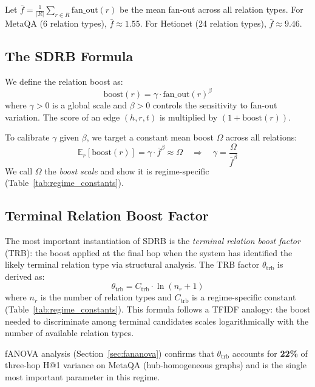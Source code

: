 \documentclass[11pt,a4paper]{article}
\begin{document}
Let $\bar{f} = \frac{1}{|R|}\sum_{r \in R} \text{fan\_out}(r)$ be the
mean fan-out across all relation types.
For MetaQA (6 relation types), $\bar{f} \approx 1.55$.
For Hetionet (24 relation types), $\bar{f} \approx 9.46$.

\subsection{The SDRB Formula}

We define the relation boost as:
\begin{equation}
  \text{boost}(r) = \gamma \cdot \text{fan\_out}(r)^{\beta}
  \label{eq:sdrb}
\end{equation}
where $\gamma > 0$ is a global scale and $\beta > 0$ controls the
sensitivity to fan-out variation.
The score of an edge $(h, r, t)$ is multiplied by $(1 + \text{boost}(r))$.

To calibrate $\gamma$ given $\beta$, we target a constant mean boost
$\Omega$ across all relations:
\begin{equation}
  \mathbb{E}_r[\text{boost}(r)] = \gamma \cdot \bar{f}^{\beta} \approx \Omega
  \quad \Longrightarrow \quad
  \gamma = \frac{\Omega}{\bar{f}^{\beta}}
  \label{eq:gamma}
\end{equation}
We call $\Omega$ the \emph{boost scale} and show it is
regime-specific (Table~\ref{tab:regime_constants}).

\subsection{Terminal Relation Boost Factor}

The most important instantiation of SDRB is the \emph{terminal relation
boost factor} (TRB): the boost applied at the final hop when the system
has identified the likely terminal relation type via structural analysis.
The TRB factor $\theta_{\text{trb}}$ is derived as:
\begin{equation}
  \theta_{\text{trb}} = C_{\text{trb}} \cdot \ln(n_r + 1)
  \label{eq:trb}
\end{equation}
where $n_r$ is the number of relation types and $C_{\text{trb}}$ is a
regime-specific constant (Table~\ref{tab:regime_constants}).
This formula follows a TFIDF analogy: the boost needed to
discriminate among terminal candidates scales logarithmically with the
number of available relation types.

fANOVA analysis (Section~\ref{sec:fananova}) confirms that
$\theta_{\text{trb}}$ accounts for \textbf{22\%} of three-hop H@1
variance on MetaQA (hub-homogeneous graphs) and is the single
most important parameter in this regime.
\end{document}
